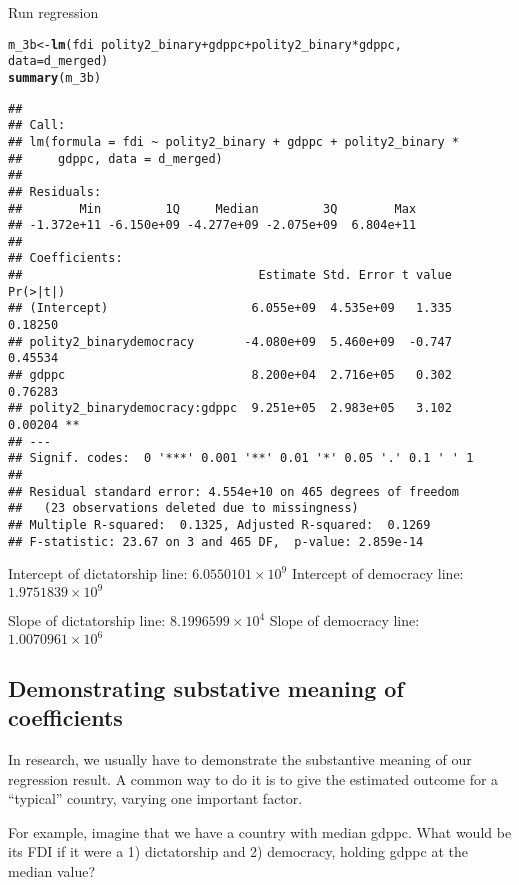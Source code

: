 \documentclass{article}\usepackage[]{graphicx}\usepackage[]{color}
\makeatletter
\newcommand{\hlopt}[1]{\textcolor[rgb]{0,0,0}{#1}}%
\newcommand{\hlstd}[1]{\textcolor[rgb]{0.345,0.345,0.345}{#1}}%
\newcommand{\hlkwb}[1]{\textcolor[rgb]{0.69,0.353,0.396}{#1}}%
\newcommand{\hlkwc}[1]{\textcolor[rgb]{0.333,0.667,0.333}{#1}}%
\newcommand{\hlkwd}[1]{\textcolor[rgb]{0.737,0.353,0.396}{\textbf{#1}}}%
\newenvironment{kframe}{%
 \def\at@end@of@kframe{}%
 \ifinner\ifhmode%
  \def\at@end@of@kframe{\end{minipage}}%
  \begin{minipage}{\columnwidth}%
 \fi\fi%
 \def\FrameCommand##1{\hskip\@totalleftmargin \hskip-\fboxsep
 \colorbox{shadecolor}{##1}\hskip-\fboxsep
     \hskip-\linewidth \hskip-\@totalleftmargin \hskip\columnwidth}%
 \MakeFramed {\advance\hsize-\width
   \@totalleftmargin\z@ \linewidth\hsize
   \@setminipage}}%
 {\par\unskip\endMakeFramed%
 \at@end@of@kframe}
\newenvironment{knitrout}{}{} %
\makeatother
\begin{document}
Run regression
\begin{knitrout}
\color{fgcolor}\begin{kframe}
\begin{alltt}
\hlstd{m_3b} \hlkwb{<-} \hlkwd{lm}\hlstd{(fdi} \hlopt{~} \hlstd{polity2_binary} \hlopt{+} \hlstd{gdppc} \hlopt{+} \hlstd{polity2_binary} \hlopt{*} \hlstd{gdppc,}
           \hlkwc{data} \hlstd{= d_merged)}
\hlkwd{summary}\hlstd{(m_3b)}
\end{alltt}
\begin{verbatim}
## 
## Call:
## lm(formula = fdi ~ polity2_binary + gdppc + polity2_binary * 
##     gdppc, data = d_merged)
## 
## Residuals:
##        Min         1Q     Median         3Q        Max 
## -1.372e+11 -6.150e+09 -4.277e+09 -2.075e+09  6.804e+11 
## 
## Coefficients:
##                                 Estimate Std. Error t value Pr(>|t|)   
## (Intercept)                    6.055e+09  4.535e+09   1.335  0.18250   
## polity2_binarydemocracy       -4.080e+09  5.460e+09  -0.747  0.45534   
## gdppc                          8.200e+04  2.716e+05   0.302  0.76283   
## polity2_binarydemocracy:gdppc  9.251e+05  2.983e+05   3.102  0.00204 **
## ---
## Signif. codes:  0 '***' 0.001 '**' 0.01 '*' 0.05 '.' 0.1 ' ' 1
## 
## Residual standard error: 4.554e+10 on 465 degrees of freedom
##   (23 observations deleted due to missingness)
## Multiple R-squared:  0.1325,	Adjusted R-squared:  0.1269 
## F-statistic: 23.67 on 3 and 465 DF,  p-value: 2.859e-14
\end{verbatim}
\end{kframe}
\end{knitrout}

Intercept of dictatorship line: \ensuremath{6.0550101\times 10^{9}}
Intercept of democracy line: \ensuremath{1.9751839\times 10^{9}}

Slope of dictatorship line: \ensuremath{8.1996599\times 10^{4}}
Slope of democracy line: \ensuremath{1.0070961\times 10^{6}}

\subsection{Demonstrating substative meaning of coefficients}

In research, we usually have to demonstrate the substantive meaning of our regression result. A common way to do it is to give the estimated outcome for a ``typical'' country, varying one important factor.

For example, imagine that we have a country with median gdppc. What would be its FDI if it were a 1) dictatorship and 2) democracy, holding gdppc at the median value?
\end{document}
